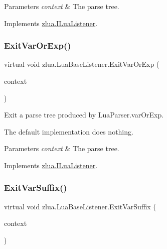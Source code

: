 \begin{DoxyParams}{Parameters}
{\em context} & The parse tree.\\
\hline
\end{DoxyParams}


Implements \mbox{\hyperlink{interfacezlua_1_1_i_lua_listener_a25fcca7c6476226f6faf33597226f9b3}{zlua.\+I\+Lua\+Listener}}.

\mbox{\label{classzlua_1_1_lua_base_listener_a741486bd709e9d345238f2f706e4e44b}} 
\subsubsection{\texorpdfstring{Exit\+Var\+Or\+Exp()}{ExitVarOrExp()}}
{\footnotesize\ttfamily virtual void zlua.\+Lua\+Base\+Listener.\+Exit\+Var\+Or\+Exp (\begin{DoxyParamCaption}\item[{\mbox{[}\+Not\+Null\mbox{]} \mbox{\hyperlink{classzlua_1_1_lua_parser_1_1_var_or_exp_context}{Lua\+Parser.\+Var\+Or\+Exp\+Context}}}]{context }\end{DoxyParamCaption})\hspace{0.3cm}{\ttfamily [virtual]}}



Exit a parse tree produced by Lua\+Parser.\+var\+Or\+Exp. 

The default implementation does nothing.


\begin{DoxyParams}{Parameters}
{\em context} & The parse tree.\\
\hline
\end{DoxyParams}


Implements \mbox{\hyperlink{interfacezlua_1_1_i_lua_listener_a0c463bdafad827e9a749f5276a7bb7df}{zlua.\+I\+Lua\+Listener}}.

\mbox{\label{classzlua_1_1_lua_base_listener_af8716e19b6123340f1a13c0ecf019d06}} 
\subsubsection{\texorpdfstring{Exit\+Var\+Suffix()}{ExitVarSuffix()}}
{\footnotesize\ttfamily virtual void zlua.\+Lua\+Base\+Listener.\+Exit\+Var\+Suffix (\begin{DoxyParamCaption}\item[{\mbox{[}\+Not\+Null\mbox{]} \mbox{\hyperlink{classzlua_1_1_lua_parser_1_1_var_suffix_context}{Lua\+Parser.\+Var\+Suffix\+Context}}}]{context }\end{DoxyParamCaption})\hspace{0.3cm}{\ttfamily [virtual]}}



